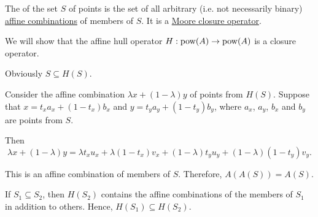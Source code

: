 \begin{definition}\label{def:affine_hull}\mimprovised
  The  of the set \( S \) of points is the set of all arbitrary (i.e. not necessarily binary) \hyperref[rem:affine_combinations]{affine combinations} of members of \( S \). It is a \hyperref[def:moore_closure_operator]{Moore closure operator}.
\end{definition}
\begin{defproof}
  We will show that the affine hull operator \( H: \operatorname{pow}(A) \to \operatorname{pow}(A) \) is a closure operator.

   Obviously \( S \subseteq H(S) \).

   Consider the affine combination \( \lambda x + (1 - \lambda) y \) of points from \( H(S) \). Suppose that \( x = t_x a_x + (1 - t_x) b_x \) and \( y = t_y a_y + (1 - t_y) b_y \), where \( a_x \), \( a_y \), \( b_x \) and \( b_y \) are points from \( S \).

  Then
  \begin{equation*}
    \lambda x + (1 - \lambda) y
    =
    \lambda t_x u_x + \lambda (1 - t_x) v_x + (1 - \lambda) t_y u_y + (1 - \lambda) (1 - t_y) v_y.
  \end{equation*}

  This is an affine combination of members of \( S \). Therefore, \( A(A(S)) = A(S) \).

   If \( S_1 \subseteq S_2 \), then \( H(S_2) \) contains the affine combinations of the members of \( S_1 \) in addition to others. Hence, \( H(S_1) \subseteq H(S_2) \).
\end{defproof}

